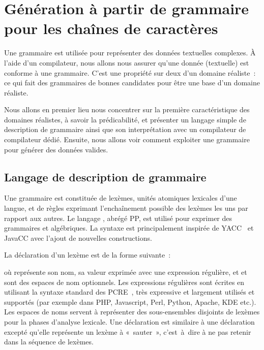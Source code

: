 \section{Génération à partir de grammaire pour les chaînes de caractères}
\label{section:data:strings}

Une grammaire est utilisée pour représenter des données textuelles complexes.  À
l'aide d'un compilateur, nous allons nous assurer qu'une donnée (textuelle) est
conforme à une grammaire. C'est une propriété sur deux d'un domaine réaliste~:
ce qui fait des grammaires de bonnes candidates pour être une base d'un domaine
réaliste.

Nous allons en premier lieu nous concentrer sur la première caractéristique des
domaines réalistes, à savoir la prédicabilité, et présenter un langage simple de
description de grammaire ainsi que son interprétation avec un compilateur de
compilateur dédié. Ensuite, nous allons voir comment exploiter une grammaire
pour générer des données valides.

\subsection{Langage de description de grammaire}
\label{subsection:data:pp}

Une grammaire est constituée de lexèmes, unités atomiques lexicales d'une
langue, et de règles exprimant l'enchaînement possible des lexèmes les uns par
rapport aux autres. Le langage , abrégé PP, est utilisé
pour exprimer des grammaires  et algébriques. La syntaxe est
principalement inspirée de YACC~ et JavaCC avec l'ajout de
nouvelles constructions.

La déclaration d'un lexème est de la forme suivante~:

\begin{pre}
\end{pre}
%
où  représente son nom,  sa valeur exprimée avec une
expression régulière, et  et  sont des espaces
de nom optionnels. Les expressions régulières sont écrites en utilisant la
syntaxe standard des PCRE~, très expressive et largement utilisés
et supportés (par exemple dans PHP, Javascript, Perl, Python, Apache, KDE etc.).
Les espaces de noms servent à représenter des sous-ensembles disjoints de
lexèmes pour la phases d'analyse lexicale. Une déclaration  est
similaire à une déclaration  excepté qu'elle représente un lexème
à «~sauter~», c'est~à~dire à ne pas retenir dans la séquence de lexèmes.

